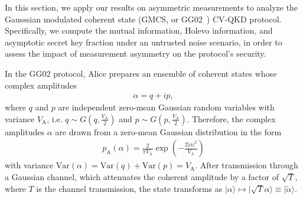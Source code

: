 \documentclass[%
reprint,
superscriptaddress,
 amsmath,amssymb,amsfonts,
 aps,
 pra,
 longbibliography
]{revtex4-2}
\newcommand{\ket}[1]{\ensuremath{|{#1}\rangle}}
\newcommand{\ind}[1]{\mathrm{#1}}
\begin{document}
In this section, we apply our results on asymmetric measurements to analyze the Gausssian modulated coherent state (GMCS, or GG02~\cite{PhysRevLett.88.057902}) CV-QKD protocol. Specifically, we compute the mutual information, Holevo information, and asymptotic secret key fraction under an untrusted noise scenario, in order to assess the impact of measurement asymmetry on the protocol’s security.

In the GG02 protocol, Alice prepares an ensemble of coherent states whose 
complex amplitudes 
\begin{align}
  \label{eq:alpha-def}
  \alpha={q+ip},
\end{align}
where $q$ and $p$ are independent zero-mean Gaussian random variables with variance ${V_{\ind{A}}}$, i.e. $q\sim G(q, \frac{V_{\ind{A}}}2)$ and $p\sim G(p, \frac{V_{\ind{A}}}2)$. Therefore, the complex amplitudes $\alpha$
are drawn from a zero-mean Gaussian distribution in the form
\begin{align}
  \label{eq:p_A}
  p_{\ind{A}}(\alpha)=\frac{2}{\pi V_{\ind{A}}} \exp\left(-\frac{2|\alpha|^2}{V_{\ind{A}}}\right)
\end{align}
with variance $\ind{Var}(\alpha)=\ind{Var}(q)+\ind{Var}(p)=V_{\ind{A}}$.
After transmission through a Gaussian channel, which attenuates the coherent amplitude by a factor of $\sqrt{T}$, where $T$ is the channel transmission, the state transforms as $\ket{\alpha}\mapsto\ket{\sqrt{T}\alpha}\equiv\ket{\tilde\alpha}$.
\end{document}
